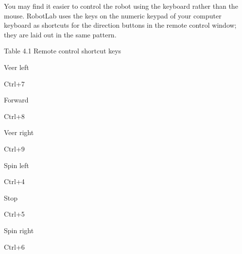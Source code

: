 \documentclass[letterpaper,10pt,english]{sphinxmanual}
\begin{document}
You may find it easier to control the robot using the keyboard rather than the mouse. RobotLab uses the keys on the numeric keypad of your computer keyboard as short\sphinxhyphen{}cuts for the direction buttons in the remote control window; they are laid out in the same pattern.





Table 4.1 Remote control short\sphinxhyphen{}cut keys









\noindent{}

Veer left

Ctrl+7





\noindent{}

Forward

Ctrl+8





\noindent{}

Veer right

Ctrl+9









\noindent{}

Spin left

Ctrl+4





\noindent{}

Stop

Ctrl+5





\noindent{}

Spin right

Ctrl+6
\end{document}
